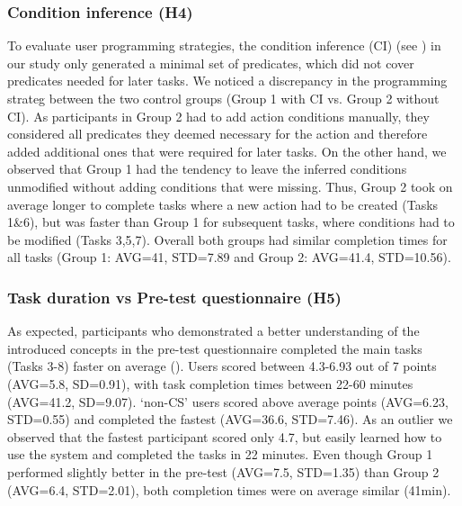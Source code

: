 \subsubsection{Condition inference (H4)} 
To evaluate user programming strategies, the condition inference (CI) (see ) in our study only generated a minimal set of predicates, which did not cover predicates needed for later tasks.
We noticed a discrepancy in the programming strateg between the two control groups (Group 1 with CI vs. Group 2 without CI).
As participants in Group 2 had to add action conditions manually, they considered all predicates they deemed necessary for the action and therefore added additional ones that were required for later tasks.
On the other hand, we observed that Group 1 had the tendency to leave the inferred conditions unmodified without adding conditions that were missing.
Thus, Group 2 took on average longer to complete tasks where a new action had to be created (Tasks 1\&6), but was faster than Group 1 for subsequent tasks, where conditions had to be modified (Tasks 3,5,7).
Overall both groups had similar completion times for all tasks (Group 1: AVG=41, STD=7.89 and Group 2: AVG=41.4, STD=10.56).

\subsubsection{Task duration vs Pre-test questionnaire (H5)} 
As expected, participants who demonstrated a better understanding of the introduced concepts in the pre-test questionnaire completed the main tasks (Tasks 3-8) faster on average ().
Users scored between 4.3-6.93 out of 7 points (AVG=5.8, SD=0.91), with task completion times between 22-60 minutes (AVG=41.2, SD=9.07).
`non-CS' users scored above average points (AVG=6.23, STD=0.55) and completed the fastest (AVG=36.6, STD=7.46).
As an outlier we observed that the fastest participant scored only 4.7, but easily learned how to use the system and completed the tasks in 22 minutes.
Even though Group 1 performed slightly better in the pre-test (AVG=7.5, STD=1.35) than Group 2 (AVG=6.4, STD=2.01), both completion times were on average similar (41min).

